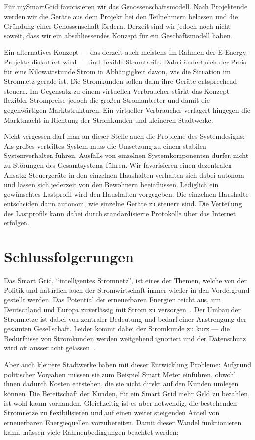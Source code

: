 \documentclass[12pt,BCOR=8.5mm]{scrartcl}
\begin{document}
Für mySmartGrid favorisieren wir das Genossenschaftsmodell. Nach
Projektende werden wir die Geräte aus dem Projekt bei den Teilnehmern
belassen und die Gründung einer Genossenschaft fördern. Derzeit sind wir
jedoch noch nicht soweit, dass wir ein abschliessendes Konzept für ein
Geschäftsmodell haben.

Ein alternatives Konzept --- das derzeit auch meistens im Rahmen der
E-Energy-Projekte diskutiert wird --- sind flexible Stromtarife. Dabei
ändert sich der Preis für eine Kilowattstunde Strom in Abhängigkeit
davon, wie die Situation im Stromnetz gerade ist. Die Stromkunden sollen
dann ihre Geräte entsprechend steuern. Im Gegensatz zu einem virtuellen
Verbraucher stärkt das Konzept flexibler Strompreise jedoch die großen
Stromanbieter und damit die gegenwärtigen Marktstrukturen. Ein virtueller
Verbraucher verlagert hingegen die Marktmacht in Richtung der
Stromkunden und kleineren Stadtwerke.

Nicht vergessen darf man an dieser Stelle auch die Probleme des Systemdesigns:
Als großes verteiltes System muss die Umsetzung zu einem stabilen
Systemverhalten führen. Ausfälle von einzelnen Systemkomponenten dürfen
nicht zu Störungen des Gesamtsystems führen.  Wir favorisieren 
einen dezentralen Ansatz: Steuergeräte in den einzelnen Haushalten
verhalten sich dabei autonom und lassen sich jederzeit von den Bewohnern
beeinflussen. Lediglich ein gewünschtes Lastprofil wird
den Haushalten vorgegeben. Die einzelnen Haushalte entscheiden dann
autonom, wie einzelne Geräte zu steuern sind.  Die Verteilung des
Lastprofils kann dabei durch standardisierte Protokolle über das
Internet erfolgen.


\section{Schlussfolgerungen}
Das Smart Grid, "`intelligentes Stromnetz"', ist eines der Themen, welche
von der Politik und natürlich auch der Stromwirtschaft immer wieder in
den Vordergrund gestellt werden. Das Potential der erneuerbaren Energien
reicht aus, um Deutschland und Europa zuverlässig mit Strom zu
versorgen~\cite{sachverst10erneuerbar}. Der Umbau der Stromnetze ist
dabei von zentraler Bedeutung und bedarf einer Anstrengung der gesamten
Gesellschaft. Leider kommt dabei der Stromkunde zu
kurz --- die Bedürfnisse von Stromkunden werden weitgehend ignoriert und
der Datenschutz wird oft ausser acht gelassen~\cite{web:bmwinutzerschutz}.

Aber auch kleinere Stadtwerke haben mit dieser Entwicklung Probleme:
Aufgrund politischer Vorgaben müssen sie zum Beispiel Smart Meter
einführen, obwohl ihnen dadurch Kosten entstehen, die sie nicht direkt
auf den Kunden umlegen können. Die Bereitschaft der Kunden, für ein
Smart Grid mehr Geld zu bezahlen, ist wohl kaum vorhanden. Gleichzeitig
ist es aber notwendig, die bestehenden Stromnetze zu flexibilisieren und
auf einen weiter steigenden Anteil von erneuerbaren Energiequellen
vorzubereiten. Damit dieser Wandel funktionieren kann, müssen viele
Rahmenbedingungen beachtet werden:
\end{document}
